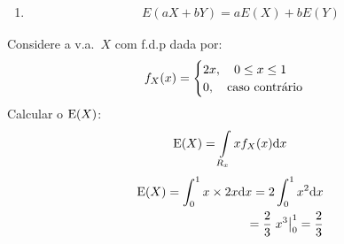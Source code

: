 \begin{description}
\begin{enumerate}[label=(\alph*)]
             \item 
             \begin{align}  E(aX + bY)=aE(X)+ b E(Y)\end{align}
           \end{enumerate}
           \begin{example}Considere a v.a.\ $X$ com f.d.p dada por: 
             \begin{align*}
               f_{X}(x)=\begin{cases}
                 2x,\quad 0\le x \le 1 \\
                 0, \text{\quad caso contrário}
               \end{cases}
             \end{align*}
             Calcular o $\operatorname{E}(X)$:
             \begin{align*}
               \operatorname{E}(X)=\int \limits_{R_{x}} x f_{X}(x)\mathrm{d}x
             \end{align*}
             \begin{align*}
               \operatorname{E}(X)=\int_{0}^{1} x\times 2x\mathrm{d}x=2 \int_{0}^{1} x^{2}\mathrm{d}x \\
               = \frac{2}{3} \left.x^{3}\right\rvert_{0}^{1} = \frac{2}{3}
             \end{align*}

           \end{example}           %



\end{description}
